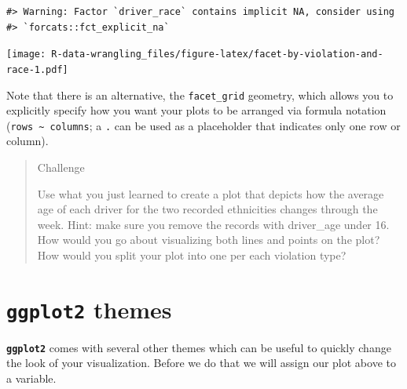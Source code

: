 \documentclass[]{book}
\newenvironment{Shaded}{\begin{snugshade}}{\end{snugshade}}
\newcommand{\CommentTok}[1]{\textcolor[rgb]{0.56,0.35,0.01}{\textit{#1}}}
\newcommand{\DataTypeTok}[1]{\textcolor[rgb]{0.13,0.29,0.53}{#1}}
\newcommand{\KeywordTok}[1]{\textcolor[rgb]{0.13,0.29,0.53}{\textbf{#1}}}
\newcommand{\NormalTok}[1]{#1}
\newcommand{\OperatorTok}[1]{\textcolor[rgb]{0.81,0.36,0.00}{\textbf{#1}}}
\newcommand{\StringTok}[1]{\textcolor[rgb]{0.31,0.60,0.02}{#1}}
\begin{document}
\begin{verbatim}
#> Warning: Factor `driver_race` contains implicit NA, consider using
#> `forcats::fct_explicit_na`
\end{verbatim}

\texttt{[image: R-data-wrangling\_files/figure-latex/facet-by-violation-and-race-1.pdf]}

Note that there is an alternative, the \texttt{facet\_grid} geometry, which allows you to explicitly specify how you want your plots to be
arranged via formula notation (\texttt{rows\ \textasciitilde{}\ columns}; a \texttt{.} can be used as
a placeholder that indicates only one row or column).

\begin{quote}
Challenge

Use what you just learned to create a plot that depicts how the average age
of each driver for the two recorded ethnicities changes through the week.
Hint: make sure you remove the records with driver\_age under 16.
How would you go about visualizing both lines and points on the plot?
How would you split your plot into one per each violation type?
\end{quote}

\hypertarget{ggplot2-themes}{%
\section{\texorpdfstring{\textbf{\texttt{ggplot2}} themes}{ggplot2 themes}}\label{ggplot2-themes}}

\textbf{\texttt{ggplot2}}
comes with several other themes which can be useful to quickly change the look of your visualization. Before we do that we will assign our plot above to a variable.

\begin{Shaded}
\end{Shaded}
\end{document}
